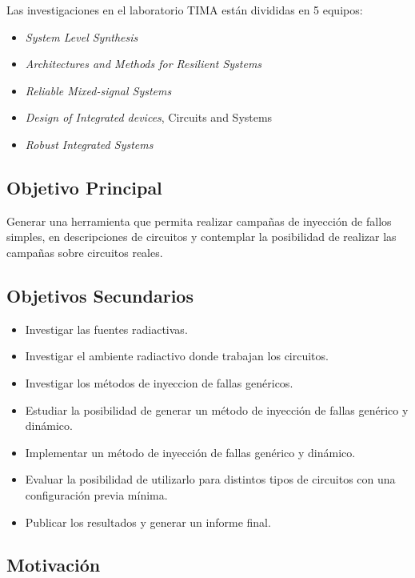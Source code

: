 \documentclass[a4paper,openright,12pt]{report}
\begin{document}
\pagebreak
Las investigaciones en el laboratorio TIMA están divididas en 5 equipos:
\begin{itemize}
\item \textit{System Level Synthesis} ~\cite{SLS}
\item \textit{Architectures and Methods for Resilient Systems} ~\cite{AMfoRS}
\item \textit{Reliable Mixed-signal Systems} ~\cite{RMS}
\item \textit{Design of Integrated devices}, Circuits and Systems ~\cite{CDSI}
\item \textit{Robust Integrated Systems} ~\cite{RIS}
\end{itemize}





\subsection{Objetivo Principal}
Generar una herramienta que permita realizar campañas de inyección de fallos simples, en descripciones de circuitos y contemplar la posibilidad de realizar las campañas sobre circuitos reales.


\subsection{Objetivos Secundarios}
\begin{itemize}

\item Investigar las fuentes radiactivas. 
\item Investigar el ambiente radiactivo donde trabajan los circuitos. 
\item Investigar los métodos de inyeccion de fallas genéricos. 
\item Estudiar la posibilidad de generar un método de inyección de fallas genérico y dinámico. 
\item Implementar un método de inyección de fallas genérico y dinámico. 
\item Evaluar la posibilidad de utilizarlo para distintos tipos de circuitos con una configuración previa mínima.
\item Publicar los resultados y generar un informe final.
\end{itemize}

\subsection{Motivación}
\end{document}
